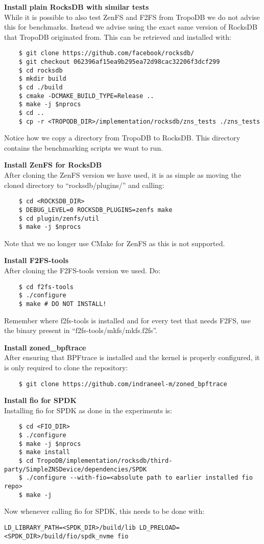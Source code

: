 \textbf{Install plain RocksDB with similar tests}\\
While it is possible to also test ZenFS and F2FS from TropoDB we do not advise this for benchmarks. Instead we advise using the exact same version of RocksDB that TropoDB originated from. This can be retrieved and installed with:
\begin{verbatim}
    $ git clone https://github.com/facebook/rocksdb/
    $ git checkout 062396af15ea9b295ea72d98cac32206f3dcf299
    $ cd rocksdb
    $ mkdir build
    $ cd ./build
    $ cmake -DCMAKE_BUILD_TYPE=Release ..
    $ make -j $nprocs
    $ cd ..
    $ cp -r <TROPODB_DIR>/implementation/rocksdb/zns_tests ./zns_tests
\end{verbatim}
Notice how we copy a directory from TropoDB to RocksDB. This directory contains the benchmarking scripts we want to run.

\textbf{Install ZenFS for RocksDB}\\
After cloning the ZenFS version we have used, it is as simple as moving the cloned directory to ``rocksdb/plugins/'' and calling:
\begin{verbatim}
    $ cd <ROCKSDB_DIR>
    $ DEBUG_LEVEL=0 ROCKSDB_PLUGINS=zenfs make
    $ cd plugin/zenfs/util
    $ make -j $nprocs
\end{verbatim}
Note that we no longer use CMake for ZenFS as this is not supported.

\textbf{Install F2FS-tools}\\
After cloning the F2FS-tools version we used. Do:
\begin{verbatim}
    $ cd f2fs-tools
    $ ./configure
    $ make # DO NOT INSTALL!
\end{verbatim}
Remember where f2fs-tools is installed and for every test that needs F2FS, use the binary present in ``f2fs-tools/mkfs/mkfs.f2fs''.

\textbf{Install zoned\_bpftrace}\\
After ensuring that BPFtrace is installed and the kernel is properly configured, it is only required to clone the repository:
\begin{verbatim}
    $ git clone https://github.com/indraneel-m/zoned_bpftrace
\end{verbatim}

\textbf{Install fio for SPDK}\\
Installing fio for SPDK as done in the experiments is:
\begin{verbatim}
    $ cd <FIO_DIR>
    $ ./configure
    $ make -j $nprocs
    $ make install
    $ cd TropoDB/implementation/rocksdb/third-party/SimpleZNSDevice/dependencies/SPDK
    $ ./configure --with-fio=<absolute path to earlier installed fio repo>
    $ make -j
\end{verbatim}
Now whenever calling fio for SPDK, this needs to be done with:
\begin{verbatim}
LD_LIBRARY_PATH=<SPDK_DIR>/build/lib LD_PRELOAD=<SPDK_DIR>/build/fio/spdk_nvme fio
\end{verbatim}

